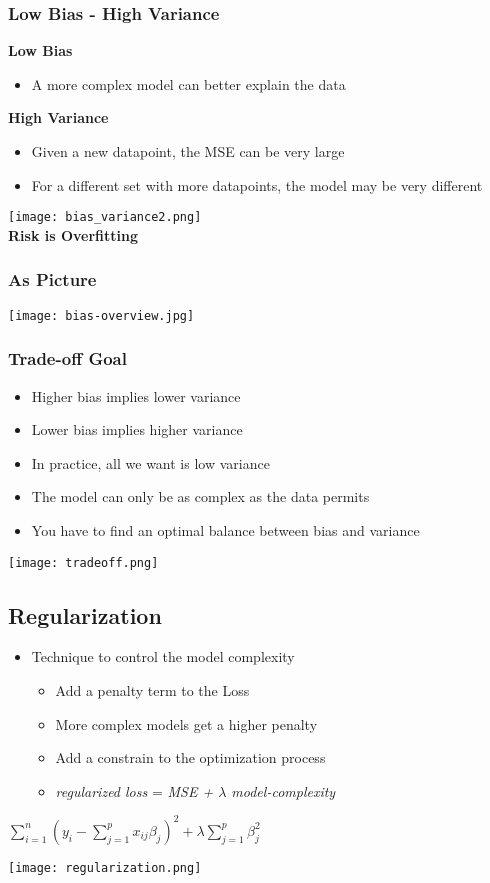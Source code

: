 \subsubsection{Low Bias - High Variance}
\textbf{Low Bias}
\begin{itemize}
    \item A more complex model can better explain the data
\end{itemize}
\textbf{High Variance}
\begin{itemize}
    \item Given a new datapoint, the MSE can be very large
    \item For a different set with more datapoints, the model may be very different
\end{itemize}
\texttt{[image: bias\_variance2.png]}\\
\textbf{Risk is Overfitting}
\subsubsection{As Picture}
\texttt{[image: bias-overview.jpg]}

\subsubsection{Trade-off Goal}
\begin{itemize}
    \item Higher bias implies lower variance
    \item Lower bias implies higher variance
    \item In practice, all we want is low variance
    \item The model can only be as complex as the data permits
    \item You have to find an optimal balance between bias and variance
\end{itemize}
\texttt{[image: tradeoff.png]}

\subsection{Regularization}
\begin{itemize}
    \item Technique to control the model complexity
          \begin{itemize}
              \item Add a penalty term to the Loss
              \item More complex models get a higher penalty
              \item Add a constrain to the optimization process
              \item \textit{regularized loss} = \textit{MSE + $\lambda$ model-complexity}
          \end{itemize}
\end{itemize}
\begin{center}
    $\displaystyle\sum_{i = 1}^{n} (y_i - \displaystyle\sum_{j = 1}^{p} x_{ij}\beta_j)^2 + \lambda \displaystyle\sum_{j = 1}^{p}\beta_j^2$
\end{center}
\texttt{[image: regularization.png]}

